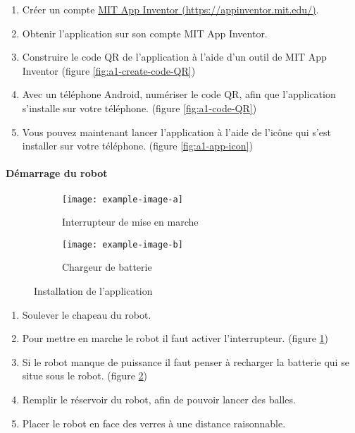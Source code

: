\begin{enumerate}
    \item Créer un compte \href{https://appinventor.mit.edu/}{MIT App Inventor (https://appinventor.mit.edu/)}.
    \item Obtenir l’application sur son compte MIT App Inventor.
    \item Construire le code QR de l’application à l’aide d’un outil de MIT App Inventor (figure \ref{fig:a1-create-code-QR})
    \item Avec un téléphone Android, numériser le code QR, afin que l’application s’installe sur votre téléphone. (figure \ref{fig:a1-code-QR})
    \item Vous pouvez maintenant lancer l’application à l’aide de l’icône qui s’est installer sur votre téléphone. (figure \ref{fig:a1-app-icon})
\end{enumerate}

\paragraph{Démarrage du robot}

\begin{wrapfigure}{r}{0.5\linewidth}
    \centering

    \begin{subfigure}{0.4\linewidth}
        \centering
        \texttt{[image: example-image-a]}
        \caption{Interrupteur de mise en marche}
        \label{fig:a1-interrupteur}
    \end{subfigure}
    \begin{subfigure}{0.4\linewidth}
        \centering
        \texttt{[image: example-image-b]}
        \caption{Chargeur de batterie}
        \label{fig:a1-chargeur-batterie}
    \end{subfigure}

    \caption{Installation de l’application}
    \label{fig:template-example-flottante}
\end{wrapfigure}

\begin{enumerate}
    \item Soulever le chapeau du robot. 
    \item Pour mettre en marche le robot il faut activer l’interrupteur. (figure \ref{fig:a1-interrupteur})
    \item Si le robot manque de puissance il faut penser à recharger la batterie qui se situe sous le robot. (figure \ref{fig:a1-chargeur-batterie})
    \item Remplir le réservoir du robot, afin de pouvoir lancer des balles.
    \item Placer le robot en face des verres à une distance raisonnable.
\end{enumerate}

